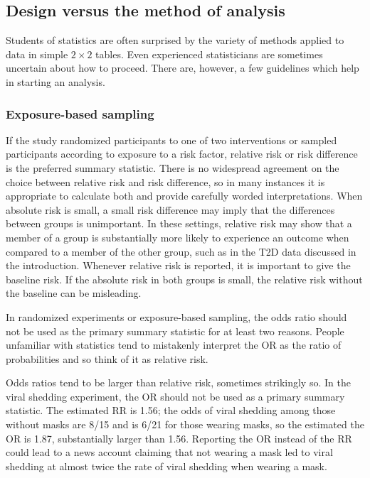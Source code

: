 \subsection{Design versus the method of analysis}
\label{designVsAnalysisBinaryData}

Students of statistics are often surprised by the variety of methods applied to data in simple $2 \times 2$ tables.  Even experienced statisticians are sometimes uncertain about how to proceed.  There are, however, a few guidelines which help in starting an analysis.


\subsubsection{Exposure-based sampling}


If the study randomized participants to one of two interventions or sampled participants according to exposure to a risk factor, relative risk or risk difference is the preferred summary statistic.  There is no widespread agreement on the choice between relative risk and risk difference, so in many instances it is appropriate to calculate both and provide carefully worded interpretations. When absolute risk is small, a small risk difference may imply that the differences between groups is unimportant. In these settings, relative risk may show that a member of a group is substantially more likely to experience an outcome when compared to a member of the other group, such as in the T2D data discussed in the introduction.  Whenever relative risk is reported, it is important to give the baseline risk.  If the absolute risk in both groups is small, the relative risk without the baseline can be misleading.

In randomized experiments or exposure-based sampling, the odds ratio should not be used as the primary summary statistic for at least two reasons.  People unfamiliar with statistics tend to mistakenly interpret the OR as the ratio of probabilities and so think of it as relative risk.  

Odds ratios tend to be larger than relative risk, sometimes strikingly so.  In the viral shedding experiment, the OR should not be used as a primary summary statistic. The estimated RR is 1.56; the odds of viral shedding among those without masks are 8/15 and is 6/21 for those wearing masks, so the estimated the OR is 1.87, substantially larger than 1.56. Reporting the OR instead of the RR could lead to a news account claiming that not wearing a mask led to viral shedding at almost twice the rate of viral shedding when wearing a mask.



